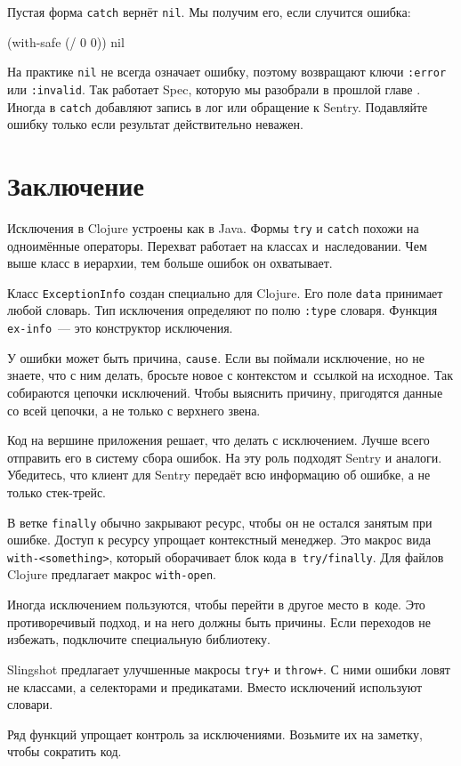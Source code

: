 \noindent
Пустая форма \verb|catch| вернёт \verb|nil|. Мы получим его, если случится
ошибка:

\begin{english}
  \begin{clojure}
(with-safe (/ 0 0))
nil
  \end{clojure}
\end{english}

На практике \verb|nil| не всегда означает ошибку, поэтому возвращают ключи
\verb|:error| или \verb|:invalid|. Так работает Spec, которую мы разобрали в
прошлой главе . Иногда в \verb|catch| добавляют запись в
лог или обращение к Sentry. Подавляйте ошибку только если результат
действительно неважен.

\section{Заключение}

Исключения в Clojure устроены как в Java. Формы \verb|try| и \verb|catch| похожи
на одноимённые операторы. Перехват работает на классах и~наследовании. Чем выше
класс в иерархии, тем больше ошибок он охватывает.

Класс \verb|ExceptionInfo| создан специально для Clojure. Его поле
\verb|data| принимает любой словарь. Тип исключения определяют по полю
\verb|:type| словаря. Функция \verb|ex-info|~--- это конструктор исключения.

У ошибки может быть причина, \verb|cause|. Если вы поймали исключение, но не
знаете, что с ним делать, бросьте новое с контекстом и~ссылкой на исходное. Так
собираются цепочки исключений. Чтобы выяснить причину, пригодятся данные со всей
цепочки, а не только с верхнего звена.

Код на вершине приложения решает, что делать с исключением. Лучше всего
отправить его в систему сбора ошибок. На эту роль подходят Sentry и
аналоги. Убедитесь, что клиент для Sentry передаёт всю информацию об ошибке, а не
только стек-трейс.

\mnoindent
В ветке \verb|finally| обычно закрывают ресурс, чтобы он не остался занятым
при ошибке. Доступ к ресурсу упрощает контекстный менеджер. Это макрос вида
\verb|with-<something>|, который оборачивает блок кода
в~\verb|try/finally|. Для файлов Clojure предлагает макрос \verb|with-open|.

Иногда исключением пользуются, чтобы перейти в другое место в~коде. Это
противоречивый подход, и на него должны быть причины. Если переходов не
избежать, подключите специальную библиотеку.

Slingshot предлагает улучшенные макросы \verb|try+| и \verb|throw+|. С ними
ошибки ловят не классами, а селекторами и предикатами. Вместо исключений
используют словари.

Ряд функций упрощает контроль за исключениями. Возьмите их на заметку, чтобы
сократить код.
